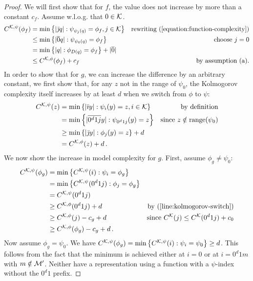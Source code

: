 \begin{proof}
We will first show that for $f$, the value does not increase by more than a constant $c_f$. Assume w.l.o.g. that $0 \in {\cal K}$.
\begin{align*}
C^{{\cal K}, \psi}(\phi_f) &= \min\left\{|\bar \jmath q| : \psi_{\psi_j(q)} = \phi_f, j \in {\cal K} \right\} & \text{rewriting (\ref{equation:function-complexity})} \\
&\leq \min \left\{ |\overline{0} q| : \psi_{\psi_0(q)} = \phi_f \right\}& \text{choose $j=0$} \\
&= \min \left\{ |q| : \phi_{D(q)} = \phi_f \right\} + |\overline{0}| \\
&\leq C^{{\cal K}, \phi}(\phi_f) + c_f & \text{by assumption (a).}
\end{align*}
In order to show that for $g$, we can increase the difference by an arbitrary constant, we first show that, for any $z$ not in the range of $\psi_0$, the Kolmogorov complexity itself increases by at least $d$ when we switch from $\phi$ to $\psi$:
\begin{align}
C^{{\cal K}, \psi}(z) &= \min\left\{|\bar\imath y| : \psi_i(y) = z, i \in {\cal K} \right\} & \text{by definition}\nonumber\\
&= \min\left\{|\overline{0^d1j} y| : \psi_{0^d1j}(y) = z \right\} & \text{since $z\notin \text{range}(\psi_0)$} \nonumber\\
&\geq \min\left\{|\bar \jmath y| : \phi_{j}(y) = z \right\} + d &\nonumber\\
&= C^{{\cal K}, \phi}(z) + d\,\text{.} & \label{line:kolmogorov-switch}
\end{align}
We now show the increase in model complexity for $g$. First, assume $\phi_g \neq \psi_0$:
\begin{align*}
C^{{\cal K},\psi}(\phi_g) &= \min \left\{C^{{\cal K}, \psi}(i) : \psi_i = \phi_g \right\} \\
&= \min \left\{C^{{\cal K}, \psi}(0^d1j) : \phi_j = \phi_g \right\} \\
&= C^{{\cal K}, \psi}(0^d1j) \\
&\geq C^{{\cal K},\phi}(0^d1j) + d & \text{by (\ref{line:kolmogorov-switch})} \\
&\geq C^{{\cal K},\phi}(j) - c_g + d &\text{since $C^{\cal K}(j) \leq C^{\cal K}(0^d1j) + c_0$}\\
&\geq C^{{\cal K}, \phi}(\phi_g) - c_g + d \,\text{.}
\end{align*}
Now assume $\phi_g = \psi_0$. We have $C^{{\cal K},\psi}(\phi_g) = \min\left\{C^{{\cal K}, \psi}(i) : \psi_i = \psi_0 \right\} \geq d$. This follows from the fact that the minimum is achieved either at $i = 0$ or at $i = 0^d1m$ with $m \notin {\cal M}'$. Neither have a representation using a function with a $\psi$-index without the $0^d1$ prefix.


\end{proof}
